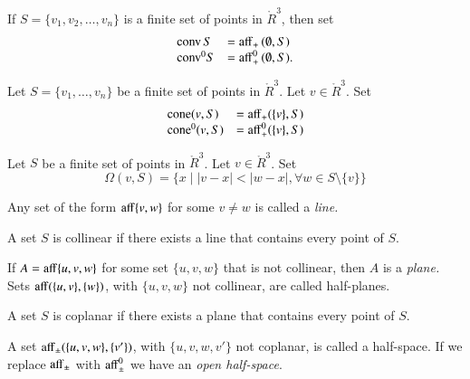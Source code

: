 \begin{definition}  If $S = \{v_1,v_2,\ldots,v_n\}$ is a finite set
of points in $\ring{R}^3$, then
set
	$$
        \begin{array}{lll}
          {\operatorname{conv}}\, S &= {\operatorname{aff}}_+\, (\emptyset,S)\\
	   {\operatorname{conv}}^0 S &= {\operatorname{aff}}^0_+\, (\emptyset,S).\\
           \end{array}
        $$
\end{definition}


\begin{definition}
Let $S=\{v_1,\ldots,v_n\}$ be a finite set of points in 
$\ring{R}^3$.  Let $v\in\ring{R}^3$. Set
  $$\begin{array}{lll}
  {\operatorname{cone}}(v,S) &= {\operatorname{aff}}_+(\{v\},S)\\
  {\operatorname{cone}}^0(v,S) &= {\operatorname{aff}}^0_+(\{v\},S)\\
  \end{array}
  $$
\end{definition}

\begin{definition} 
Let $S$ be a finite set of points in 
$\ring{R}^3$.  Let $v\in\ring{R}^3$. Set
  $$
  \Omega(v,S) = \{x \mid |v-x| < |w-x|, \forall w\in S\setminus\{v\}\}
  $$
\end{definition}
	
\begin{definition}	
Any set of the form ${\operatorname{aff}}\{v,w\}$ for some $v\ne w$ is called a 
 {\it line.}
\end{definition}

\begin{definition}  A set $S$ is collinear if there exists
a line that contains every point of $S$.
\end{definition}

\begin{definition}	
If $A={\operatorname{aff}}\{u,v,w\}$ for some set $\{u,v,w\}$ that is not collinear,
then $A$ is a {\it plane.}  Sets ${\operatorname{aff}}(\{u,v\},\{w\})$, with
$\{u,v,w\}$ not collinear, are called half-planes.
\end{definition}

\begin{definition} A set $S$ is  coplanar if there exists
a plane that contains every point of $S$.
\end{definition}

\begin{definition} A set ${\operatorname{aff}}_{\pm}(\{u,v,w\},\{v'\})$,
with $\{u,v,w,v'\}$ not coplanar, is called a half-space.  If
we replace ${\operatorname{aff}}_{\pm}$ with ${\operatorname{aff}}_{\pm}^0$ we have an
{\it open half-space}.
\end{definition}

